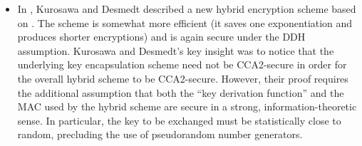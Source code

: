 \begin{itemize}




\item In \cite{kurosawa:newparadigm}, Kurosawa and Desmedt described a new
hybrid encryption scheme based on \cite{shoup:hedge}. The scheme is somewhat
more efficient (it saves one exponentiation and produces shorter encryptions)
and is again secure under the DDH assumption.  Kurosawa and Desmedt's key
insight was to notice that the underlying key encapsulation scheme need not be
CCA2-secure in order for the overall hybrid scheme to be CCA2-secure. However,
their proof requires the additional assumption that both the ``key derivation
function'' and the MAC used by the hybrid scheme are secure in a strong,
information-theoretic sense. In particular, the key to be exchanged must be
statistically close to random, precluding the use of pseudorandom number
generators.


\end{itemize}
